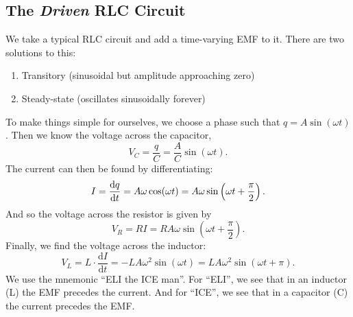 \documentclass[class=article, crop=false]{standalone}
\begin{document}
  \subsection{The \emph{Driven} RLC Circuit}
  We take a typical RLC circuit and add a time-varying EMF to it. There are two solutions to this:
  \begin{enumerate}
    \item Transitory (sinusoidal but amplitude approaching zero)
    \item Steady-state (oscillates sinusoidally forever)
  \end{enumerate}
  To make things simple for ourselves, we choose a phase such that $q = A\sin (\omega t)$. Then we know the voltage across the capacitor,
  \[
    V_C = \frac{q}{C} = \frac{A}{C}\sin (\omega t).
  \]
  The current can then be found by differentiating:
  \[
    I = \frac{\mathrm{d}q}{\mathrm{d}t} = A\omega \cos(\omega t) = A\omega\sin \left( \omega t + \frac{\pi}{2} \right).
  \]
  And so the voltage across the resistor is given by
  \[
    V_R = RI = RA\omega\sin \left(\omega t + \frac{\pi}{2}\right).
  \]
  Finally, we find the voltage across the inductor:
  \[
    V_L = L\cdot \frac{\mathrm{d}I}{\mathrm{d}t} = -LA\omega^2\sin(\omega t) = LA\omega^2\sin(\omega t + \pi).
  \]
  We use the mnemonic ``ELI the ICE man''. For ``ELI'', we see that in an inductor (L) the EMF precedes the current. And for ``ICE'', we see that in a capacitor (C) the current precedes the EMF.
\end{document}
